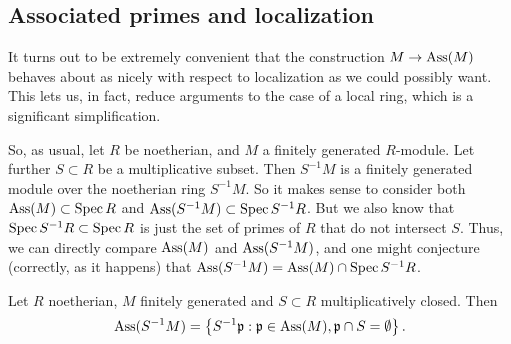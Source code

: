 \subsection{Associated primes and localization}

It turns out to be extremely convenient that the construction $M  \to \operatorname{Ass}(M)$
behaves about as nicely with respect to localization as we could possibly
want. This lets us, in fact, reduce arguments to the case of a local ring,
which is a significant simplification.

So, as usual, let $R $ be noetherian, and $M$ a finitely generated $R$-module. 
Let further $S \subset R$ be a multiplicative subset. 
Then $S^{-1}M$ is a finitely generated module over the noetherian ring
$S^{-1}M$. So it makes sense to consider both $\operatorname{Ass}(M) \subset \operatorname{Spec} R$ and
$\operatorname{Ass}(S^{-1}M) \subset \operatorname{Spec} S^{-1}R$. But we also know that $\operatorname{Spec} S^{-1}R
\subset \operatorname{Spec} R$ is just the set of primes of $R$ that do not intersect $S$.
Thus, we can directly compare $\operatorname{Ass}(M)$ and $\operatorname{Ass}(S^{-1}M)$, and one might
conjecture (correctly, as it happens) that $\operatorname{Ass}(S^{-1}M) = \operatorname{Ass}(M) \cap \operatorname{Spec}
S^{-1}R$.
\begin{proposition} \label{assmlocalization}
Let $R$ noetherian, $M$ finitely generated and $S \subset R$ multiplicatively closed. 
Then 
\[ \operatorname{Ass}(S^{-1}M)  = \left\{S^{-1}\mathfrak{p}: \mathfrak{p} \in \operatorname{Ass}(M),
\mathfrak{p}\cap S  = \emptyset \right\} . \]
\end{proposition} 
